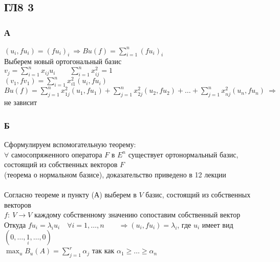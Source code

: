 \subsection*{ГЛ8 3}
\subsubsection*{\textbf{А}}
$(u_i, fu_i) = (fu_i)_i\ \Rightarrow Bu(f) = \sum\limits^{n}_{i=1} (fu_i)_i$\\
Выберем новый ортогональный базис\\
$v_j = \sum\limits^{n}_{i=1} x_{ij}u_i\qquad \sum\limits^{n}_{i=1} x^{2}_{ij} = 1$\\
$(v_1, fv_1) = \sum\limits^{n}_{i=1} x^2_{i1} (u_i, fu_i)$\\
$Bu(f) = \sum\limits^{n}_{j=1}x^2_{1j}(u_1,fu_1) + \sum\limits^{n}_{j=1} x^2_{2j} (u_2, fu_2) + \ldots + \sum\limits^{n}_{j=1} x^2_{nj} (u_n, fu_n)\ \Rightarrow$ не зависит
	
\subsubsection*{\textbf{Б}}
Сформулируем вспомогательную теорему:\\
$\forall$ самосопряженного оператора $F$ в $E^n$ существует ортонормальный базис, состоящий из собственных векторов $F$\\
(теорема о нормальном базисе), доказательство приведено в 12 лекции\\ %
\\
Согласно теореме и пункту (А) выберем в $V$ базис, состоящий из собственных векторов\\
$f:\ V \to V$ каждому собственному значению сопоставим собственный вектор\\
Откуда $fu_i = \lambda_{i} u_i\quad \forall i = 1, \ldots, n\qquad \Rightarrow (u_i, fu_i) = \lambda_{i}$, где $u_i$ имеет вид $(0, \ldots, \underset{i}{1}, \ldots, 0)$\\
$\max_u B_u(A) = \sum\limits^{r}_{j = 1} \alpha_j$ так как $\alpha_{1} \geqslant \ldots \geqslant \alpha_{n}$\\
		
		

